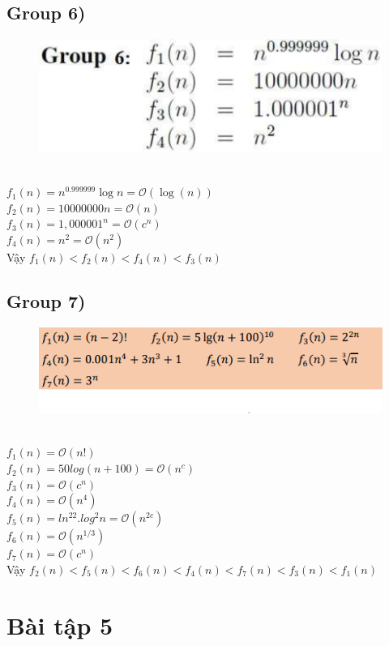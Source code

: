 \documentclass[10pt,a4paper]{article}
\begin{document}
\subsection*{Group 6)}
\begin{figure}[H]
    \centering
    \includegraphics[scale=1]{images/4g6.png}
\end{figure}
\\
$f_1(n) = n^{0.999999}\log{n} = \mathcal{O}(\log(n))$\\
$f_2(n) = 10000000n = \mathcal{O}(n)$ \\
$f_3(n) = 1,000001^n = \mathcal{O}(c^n)$\\
$f_4(n) = n^2 = \mathcal{O}(n^2)$\\
Vậy $f_1(n) < f_2(n) < f_4(n) < f_3(n)$
\subsection*{Group 7)}
\begin{figure}[H]
    \centering
    \includegraphics[scale=1]{images/4.7.png}
\end{figure}
\\
$f_1(n) = \mathcal{O}(n!)$\\
$f_2(n) = 50log(n+100) = \mathcal{O}(n^c)$ \\
$f_3(n) = \mathcal{O}(c^n)$\\
$f_4(n) = \mathcal{O}(n^4)$\\
$f_5(n) = ln^22.log^2n =  \mathcal{O}(n^{2c})$\\
$f_6(n) =  \mathcal{O}(n^{1/3})$\\
$f_7(n) =  \mathcal{O}(c^n)$\\
Vậy $f_2(n) < f_5(n ) < f_6(n) < f_4(n) < f_7(n) < f_3(n) <f_1(n)$
\section*{Bài tập 5} 
\end{document}
